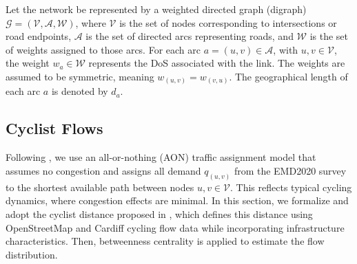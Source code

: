 \documentclass[letterpaper, 10 pt, conference]{ieeeconf}  %
\begin{document}
Let the network be represented by a weighted directed graph (digraph) $\mathcal{G} = (\mathcal{V}, \mathcal{A}, \mathcal{W})$, where $\mathcal{V}$ is the set of nodes corresponding to intersections or road endpoints, $\mathcal{A}$ is the set of directed arcs representing roads, and $\mathcal{W}$ is the set of weights assigned to those arcs. For each arc $a = (u, v) \in \mathcal{A}$, with $u,v \in \mathcal{V}$, the weight $w_a \in \mathcal{W}$ represents the DoS associated with the link. The weights are assumed to be symmetric, meaning $w_{(u,v)} = w_{(v,u)}$. The geographical length of each arc $a$ is denoted by $d_a$.




  
\subsection{Cyclist Flows}
\label{section_flows}




Following \cite{mesbah2012bilevel}, we use an all-or-nothing (AON) traffic assignment model that assumes no congestion and assigns all demand $q_{(u,v)}$ from the EMD2020 survey \cite{SMMAG_EMD} to the shortest available path  between nodes $u,v \in \mathcal{V}$. This reflects typical cycling dynamics, where congestion effects are minimal. In this section, we formalize and adopt the cyclist distance proposed in \cite{cooper2017using}, which defines this distance using OpenStreetMap and Cardiff cycling flow data while incorporating infrastructure characteristics. Then, betweenness centrality is applied to estimate the flow distribution.
\end{document}
